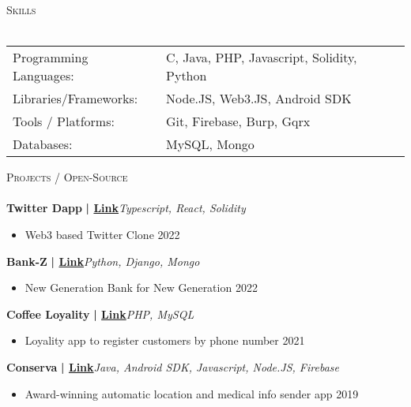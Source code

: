 \documentclass[a4paper]{article}
\newcommand{\lineunder} {
    \vspace*{-8pt} \\
    \hspace*{-18pt} \hrulefill \\
}
\newcommand{\header} [1] {
    {\hspace*{-18pt}\vspace*{6pt} \textsc{#1}}
    \vspace*{-6pt} \lineunder
}
\begin{document}
%
%
  \header{Skills}
  \vspace{2mm}
  \begin{longtable}{p{4cm}p{12cm}}
  Programming Languages: & C, Java, PHP, Javascript, Solidity, Python \\
  Libraries/Frameworks: & Node.JS, Web3.JS, Android SDK \\
  Tools / Platforms: & Git, Firebase, Burp, Gqrx \\
  Databases: & MySQL, Mongo \\
  \end{longtable}
  \vspace{1mm}

      \header{Projects / Open-Source}
      \vspace{2mm}
      {\textbf{Twitter Dapp}}\textbf{ | \href{https://github.com/goeksu/Twitter-without-Elon-Dapp}{Link}}\hfill{\sl Typescript, React, Solidity}\\
          \vspace{-3mm}
\begin{itemize} \itemsep -3pt
\item[] Web3 based Twitter Clone 2022
\end{itemize}
          \vspace*{3mm}
      {\textbf{Bank-Z}}\textbf{ | \href{http://bankz.info}{Link}}\hfill{\sl Python, Django, Mongo}\\
          \vspace{-3mm}
\begin{itemize} \itemsep -3pt
\item[] New Generation Bank for New Generation 2022
\end{itemize}
          \vspace*{3mm}
      {\textbf{Coffee Loyality}}\textbf{ | \href{https://github.com/goeksu/CoffeeLoyality}{Link}}\hfill{\sl PHP, MySQL}\\
          \vspace{-3mm}
\begin{itemize} \itemsep -3pt
\item[] Loyality app to register customers by phone number 2021
\end{itemize}
          \vspace*{3mm}
      {\textbf{Conserva}}\textbf{ | \href{https://github.com/goeksu/Conserva}{Link}}\hfill{\sl Java, Android SDK, Javascript, Node.JS, Firebase}\\
          \vspace{-3mm}
\begin{itemize} \itemsep -3pt
\item[] Award-winning automatic location and medical info sender app 2019
\end{itemize}
          \vspace*{3mm}
\end{document}
